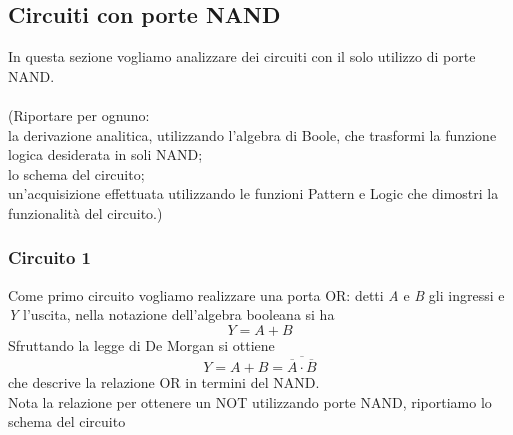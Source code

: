 \documentclass[10pt, a4paper, italian]{article}
\begin{document}
\subsection{Circuiti con porte NAND}
In questa sezione vogliamo analizzare dei circuiti con il solo utilizzo di porte NAND.\\
\\
(Riportare per ognuno:\\
la derivazione analitica, utilizzando l'algebra di Boole, che trasformi la funzione logica desiderata in soli NAND;\\
lo schema del circuito;\\
un'acquisizione effettuata utilizzando le funzioni Pattern e Logic che dimostri la funzionalità del circuito.)

\subsubsection*{Circuito 1}
Come primo circuito vogliamo realizzare una porta OR: detti \textit{A} e \textit{B} gli ingressi e \textit{Y} l'uscita, nella notazione dell'algebra booleana si ha
\[
    Y=A+B
\]
Sfruttando la legge di De Morgan si ottiene
\[
    Y=A+B=\overline{\overline{A}\cdot\overline{B}}
\]
che descrive la relazione OR in termini del NAND.\\
Nota la relazione per ottenere un NOT utilizzando porte NAND, riportiamo lo schema del circuito
\begin{figure}[htb!]
    \centering
    \label{or}
\end{figure}
\FloatBarrier
\end{document}
